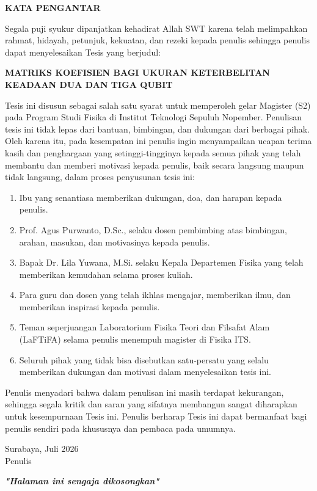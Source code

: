 \begin{center}
	\large{\textbf{KATA PENGANTAR}}
\end{center}

\indent
Segala puji syukur dipanjatkan kehadirat Allah SWT karena telah melimpahkan rahmat, hidayah, petunjuk, kekuatan, dan rezeki kepada penulis sehingga penulis dapat menyelesaikan Tesis yang berjudul:
\begin{center}
	\large{\textbf{MATRIKS KOEFISIEN BAGI UKURAN KETERBELITAN KEADAAN DUA DAN TIGA QUBIT}}
\end{center}
Tesis ini disusun sebagai salah satu syarat untuk memperoleh gelar Magister (S2) pada Program Studi Fisika di Institut Teknologi Sepuluh Nopember. Penulisan tesis ini tidak lepas dari bantuan, bimbingan, dan dukungan dari berbagai pihak. Oleh karena itu, pada kesempatan ini penulis ingin menyampaikan ucapan terima kasih dan penghargaan yang setinggi-tingginya kepada semua pihak yang telah membantu dan memberi motivasi kepada penulis, baik secara langsung maupun tidak langsung, dalam proses penyusunan tesis ini:
\begin{enumerate}
	
	\item Ibu yang senantiasa memberikan dukungan, doa, dan harapan kepada penulis.
	
	\item Prof. Agus Purwanto, D.Sc., selaku dosen pembimbing atas bimbingan, arahan, masukan, dan motivasinya kepada penulis.
	
	\item Bapak Dr. Lila Yuwana, M.Si. selaku Kepala Departemen Fisika yang telah memberikan kemudahan selama proses kuliah.
	
	\item  Para guru dan dosen yang telah ikhlas mengajar, memberikan ilmu, dan memberikan inspirasi kepada penulis.
	
	\item Teman seperjuangan Laboratorium Fisika Teori dan Filsafat Alam (LaFTiFA) selama penulis menempuh magister di Fisika ITS. 
	
	\item Seluruh pihak yang tidak bisa disebutkan satu-persatu yang selalu memberikan dukungan dan motivasi dalam menyelesaikan tesis ini.
\end{enumerate}

\indent Penulis menyadari bahwa dalam penulisan ini masih terdapat kekurangan, sehingga segala kritik dan saran yang sifatnya membangun sangat diharapkan untuk kesempurnaan Tesis ini.
Penulis berharap Tesis ini dapat bermanfaat bagi penulis sendiri pada khususnya dan pembaca pada umumnya.




\begin{flushright}
	Surabaya, Juli 2026\\
	\vspace{2cm}
	Penulis
\end{flushright}
\newpage

\newpage
\thispagestyle{empty}
\begin{center}
	\vspace*{\fill}
	\textit{\textbf{"Halaman ini sengaja dikosongkan"}}
	\vspace*{\fill}
\end{center}
\pagebreak